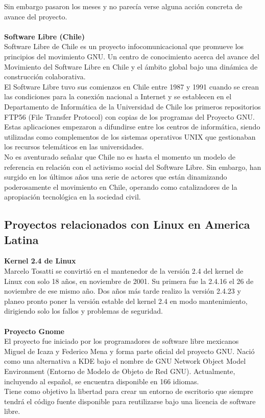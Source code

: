 \documentclass{book}
\begin{document}
Sin embargo pasaron los meses y no parecía verse alguna acción concreta de avance del proyecto.
\\
\\
{\bf Software Libre (Chile)}
\\
Software Libre de Chile es un proyecto infocomunicacional que promueve los principios del movimiento GNU. Un centro de conocimiento acerca del avance del Movimiento del Software Libre en Chile y el ámbito global bajo una dinámica de construcción colaborativa.
\\
El Software Libre tuvo sus comienzos en Chile entre 1987 y 1991 cuando se crean las condiciones para la conexión nacional a Internet y se establecen en el Departamento de Informática de la Universidad de Chile los primeros repositorios FTP56 (File Transfer Protocol) con copias de los programas del Proyecto GNU. Estas aplicaciones empezaron a difundirse entre los centros de informática, siendo utilizadas como complementos de los sistemas operativos UNIX que gestionaban los recursos telemáticos en las universidades.
\\
No es aventurado señalar que Chile no es hasta el momento un modelo de referencia en relación con el activismo social del Software Libre. Sin embargo, han surgido en los últimos años una serie de actores que están dinamizando poderosamente el movimiento en Chile, operando como catalizadores de la apropiación tecnológica en la sociedad civil.

\subsection{Proyectos relacionados con Linux en America Latina}

{\bf Kernel 2.4 de Linux}
\\
Marcelo Tosatti se convirtió en el mantenedor de la versión 2.4 del kernel de Linux con solo 18 años, en noviembre de 2001. Su primera fue la 2.4.16 el 26 de noviembre de ese mismo año. Dos años más tarde realizo la versión 2.4.23 y planeo pronto poner la versión estable del kernel 2.4 en modo mantenimiento, dirigiendo solo los fallos y problemas de seguridad.
\\
\\
{\bf Proyecto Gnome}
\\
El proyecto fue iniciado por los programadores de software libre mexicanos Miguel de Icaza y Federico Mena y forma parte oficial del proyecto GNU. Nació como una alternativa a KDE bajo el nombre de GNU Network Object Model Environment (Entorno de Modelo de Objeto de Red GNU). Actualmente, incluyendo al español, se encuentra disponible en 166 idiomas.
\\
Tiene como objetivo la libertad para crear un entorno de escritorio que siempre tendrá el código fuente disponible para reutilizarse bajo una licencia de software libre.
\end{document}
